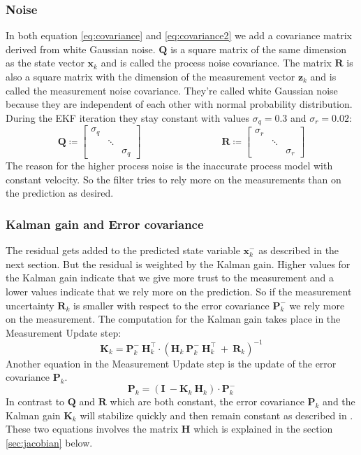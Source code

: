 \subsubsection{Noise}
In both equation \ref{eq:covariance} and \ref{eq:covariance2} we add a covariance matrix derived from white Gaussian noise. $\mathbf{Q}$ is a square matrix of the same dimension as the state vector $\mathbf{x}_k$ and is called the process noise covariance. The matrix $\mathbf{R}$ is also a square matrix with the dimension of the measurement vector $\mathbf{z}_k$ and is called the measurement noise covariance. They're called white Gaussian noise because they are independent of each other with normal probability distribution. During the EKF iteration they stay constant with values $\sigma_q = 0.3$ and $\sigma_r = 0.02$:
\begin{equation}
	\mathbf{Q} \coloneqq 
	\begin{bmatrix}
	\sigma_q & & \\
	& \ddots & \\
	& & \sigma_q
	\end{bmatrix}
\ \qquad \qquad \qquad \qquad 
\mathbf{R} \coloneqq 
\begin{bmatrix}
\sigma_r & & \\
& \ddots & \\
& & \sigma_r
\end{bmatrix}
\end{equation}
The reason for the higher process noise is the inaccurate process model with constant velocity. So the filter tries to rely more on the measurements than on the prediction as desired.


\subsubsection{Kalman gain and Error covariance}
The residual gets added to the predicted state variable $\mathbf{x}_k^-$ as described in the next section. But the residual is weighted by the Kalman gain. Higher values for the Kalman gain indicate that we give more trust to the measurement and a lower values indicate that we rely more on the prediction. So if the measurement uncertainty $\mathbf{R}_k$ is smaller with respect to the error covariance $\mathbf{P}_k^-$ we rely more on the measurement. The computation for the Kalman gain takes place in the Measurement Update step: 
\begin{equation}
\mathbf{K}_k = \mathbf{P}_k^-\ \mathbf{H}_k^\intercal\cdot (\mathbf{H}_k\ \mathbf{P}_k^-\ \mathbf{H}_k^\intercal \ + \ \mathbf{R}_k)^{-1}
\end{equation}
Another equation in the Measurement Update step is the update of the error covariance $\mathbf{P}_k$. 
\begin{equation}\label{eq:covariance2}
\mathbf{P}_k = (\mathbf{I} \ - \mathbf{K}_k\ \mathbf{H}_k)\cdot \mathbf{P}_k^-
\end{equation}
In contrast to $\mathbf{Q}$ and $\mathbf{R}$ which are both constant, the error covariance $\mathbf{P}_k$ and the Kalman gain $\mathbf{K}_k$ will stabilize quickly and then remain constant as described in \cite{kalmanbook}.
These two equations involves the matrix $\mathbf{H}$ which is explained in the section \ref{sec:jacobian} below.

